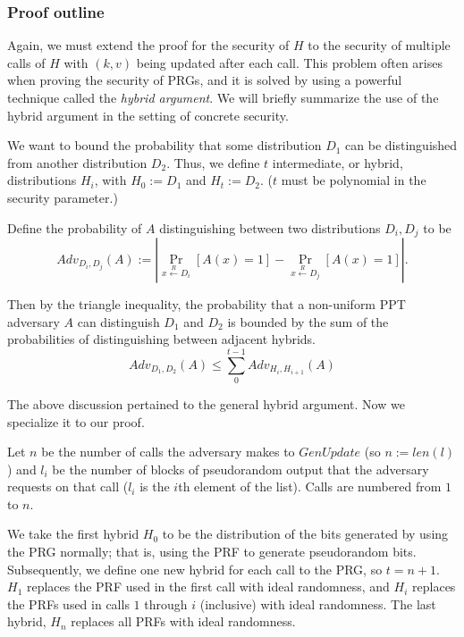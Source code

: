 \documentclass[12pt,lot, lof]{puthesis}
\begin{document}

\subsubsection{Proof outline}
Again, we must extend the proof for the security of $H$ to the security of multiple calls of $H$ with $(k,v)$ being updated after each call. This problem often arises when proving the security of PRGs, and it is solved by using a powerful technique called the \emph{hybrid argument}. We will briefly summarize the use of the hybrid argument in the setting of concrete security.

We want to bound the probability that some distribution $D_1$ can be distinguished from another distribution $D_2$. Thus, we define $t$ intermediate, or hybrid, distributions $H_i$, with $H_0 := D_1$ and $H_t := D_2$. ($t$ must be polynomial in the security parameter.) 

Define the probability of $A$ distinguishing between two distributions $D_i, D_j$ to be 
$$Adv_{D_i, D_j}(A) := | \Pr_{x \xleftarrow{R} D_i} [A(x) = 1] - \Pr_{x \xleftarrow{R} D_j} [A(x) = 1] |.$$

Then by the triangle inequality, the probability that a non-uniform PPT adversary $A$ can distinguish $D_1$ and $D_2$ is bounded by the sum of the probabilities of distinguishing between adjacent hybrids.
$$Adv_{D_1, D_2}(A) \leq \sum_{0}^{t-1} Adv_{H_i, H_{i+1}}(A)$$

The above discussion pertained to the general hybrid argument. Now we specialize it to our proof. 

Let $n$ be the number of calls the adversary makes to $GenUpdate$ (so $n := len(l)$) and $l_i$ be the number of blocks of pseudorandom output that the adversary requests on that call ($l_i$ is the $i$th element of the list). Calls are numbered from $1$ to $n$. 

We take the first hybrid $H_0$ to be the distribution of the bits generated by using the PRG normally; that is, using the PRF to generate pseudorandom bits. Subsequently, we define one new hybrid for each call to the PRG, so $t = n + 1$. $H_1$ replaces the PRF used in the first call with ideal randomness, and $H_i$ replaces the PRFs used in calls $1$ through $i$ (inclusive) with ideal randomness. The last hybrid, $H_n$ replaces all PRFs with ideal randomness. 
\end{document}

